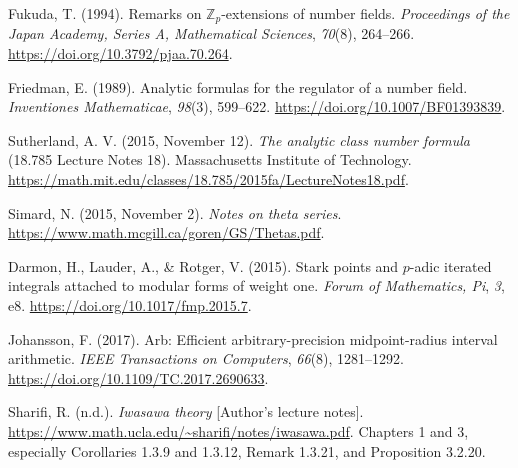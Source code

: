 Fukuda, T. (1994).
Remarks on $\mathbb Z_p$-extensions of number fields.
\emph{Proceedings of the Japan Academy, Series A, Mathematical Sciences},
\emph{70}(8), 264--266.
\url{https://doi.org/10.3792/pjaa.70.264}.

Friedman, E. (1989).
Analytic formulas for the regulator of a number field.
\emph{Inventiones Mathematicae}, \emph{98}(3), 599--622.
\url{https://doi.org/10.1007/BF01393839}.

Sutherland, A. V. (2015, November 12).
\emph{The analytic class number formula} (18.785 Lecture Notes 18).
Massachusetts Institute of Technology.
\url{https://math.mit.edu/classes/18.785/2015fa/LectureNotes18.pdf}.

Simard, N. (2015, November 2).
\emph{Notes on theta series}.
\url{https://www.math.mcgill.ca/goren/GS/Thetas.pdf}.

Darmon, H., Lauder, A., \& Rotger, V. (2015).
Stark points and $p$-adic iterated integrals attached to modular forms of
weight one.
\emph{Forum of Mathematics, Pi}, \emph{3}, e8.
\url{https://doi.org/10.1017/fmp.2015.7}.

Johansson, F. (2017).
Arb: Efficient arbitrary-precision midpoint-radius interval arithmetic.
\emph{IEEE Transactions on Computers}, \emph{66}(8), 1281--1292.
\url{https://doi.org/10.1109/TC.2017.2690633}.

Sharifi, R. (n.d.).
\emph{Iwasawa theory} [Author's lecture notes].
\url{https://www.math.ucla.edu/~sharifi/notes/iwasawa.pdf}.
Chapters 1 and 3, especially Corollaries 1.3.9 and 1.3.12,
Remark 1.3.21, and Proposition 3.2.20.
